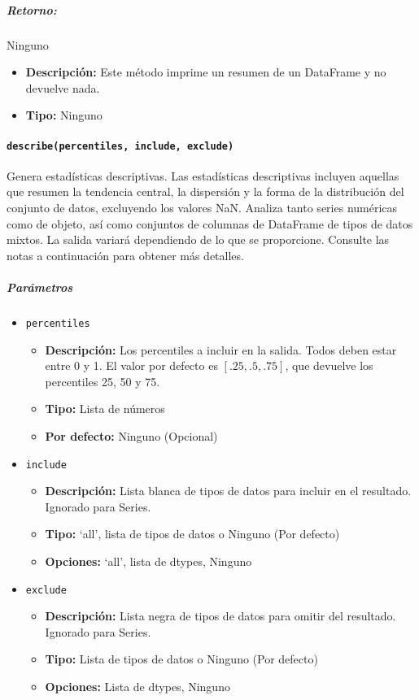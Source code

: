 \subparagraph{Retorno:} Ninguno
\begin{itemize}
    \item \textbf{Descripción:} Este método imprime un resumen de un DataFrame
          y no devuelve nada.
    \item \textbf{Tipo:} Ninguno
\end{itemize}

\paragraph{\texttt{describe(percentiles, include, exclude)}}Genera estadísticas
descriptivas. Las estadísticas descriptivas incluyen aquellas que resumen la
tendencia central, la dispersión y la forma de la distribución del conjunto de
datos, excluyendo los valores NaN. Analiza tanto series numéricas como de
objeto, así como conjuntos de columnas de DataFrame de tipos de datos mixtos.
La salida variará dependiendo de lo que se proporcione. Consulte las notas a
continuación para obtener más detalles.

\subparagraph{\textbf{Parámetros}}
\begin{itemize}
    \item \texttt{percentiles}
          \begin{itemize}
              \item \textbf{Descripción:} Los percentiles a incluir en la
                    salida. Todos deben estar entre 0 y 1. El valor por defecto es \([.25, .5,
                            .75]\), que devuelve los percentiles 25, 50 y 75.
              \item \textbf{Tipo:} Lista de números
              \item \textbf{Por defecto:} Ninguno (Opcional)
          \end{itemize}
    \item \texttt{include}
          \begin{itemize}
              \item \textbf{Descripción:} Lista blanca de tipos de datos para
                    incluir en el resultado. Ignorado para Series.
              \item \textbf{Tipo:} ‘all’, lista de tipos de datos o Ninguno
                    (Por defecto)
              \item \textbf{Opciones:} ‘all’, lista de dtypes, Ninguno
          \end{itemize}
    \item \texttt{exclude}
          \begin{itemize}
              \item \textbf{Descripción:} Lista negra de tipos de datos para
                    omitir del resultado. Ignorado para Series.
              \item \textbf{Tipo:} Lista de tipos de datos o Ninguno (Por
                    defecto)
              \item \textbf{Opciones:} Lista de dtypes, Ninguno
          \end{itemize}
\end{itemize}

